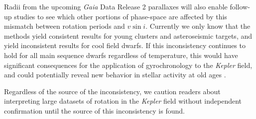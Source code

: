 \documentclass[manuscript]{aastex6}
\newcommand{\vsini}{\ensuremath{v \sin i}}
\newcommand{\Kepler}{\mbox{\textit{Kepler}}}
\newcommand{\Gaia}{\mbox{\textit{Gaia}}}
\begin{document}
Radii from the upcoming \Gaia{} Data Release 2 parallaxes will also enable 
follow-up studies to see which other portions of phase-space are affected by 
this mismatch between rotation periods and \vsini{}. Currently we only know 
that the methods yield consistent results for young clusters and 
asteroseismic targets, and yield inconsistent results for cool field dwarfs. If
this inconsistency continues to hold for all main sequence dwarfs regardless of
temperature, this would have significant consequences for the application of
gyrochronology to the \Kepler{} field, and could potentially reveal new
behavior in stellar activity at old ages \citep{vanSaders16}.

Regardless of the source of the inconsistency, we caution readers about 
interpreting large datasets of rotation in the \Kepler{} field without 
independent confirmation until the source of this inconsistency is found.




\end{document}
